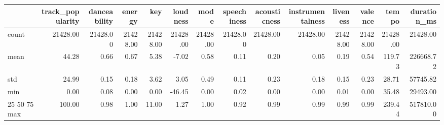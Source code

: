 \begin{tabular}{lrrrrrrrrrrrrr}
\toprule
 & track_popularity & danceability & energy & key & loudness & mode & speechiness & acousticness & instrumentalness & liveness & valence & tempo & duration_ms \\
\midrule
count & 21428.00 & 21428.00 & 21428.00 & 21428.00 & 21428.00 & 21428.00 & 21428.00 & 21428.00 & 21428.00 & 21428.00 & 21428.00 & 21428.00 & 21428.00 \\
mean & 44.28 & 0.66 & 0.67 & 5.38 & -7.02 & 0.58 & 0.11 & 0.20 & 0.05 & 0.19 & 0.54 & 119.73 & 226668.72 \\
std & 24.99 & 0.15 & 0.18 & 3.62 & 3.05 & 0.49 & 0.11 & 0.23 & 0.18 & 0.15 & 0.23 & 28.71 & 57745.82 \\
min & 0.00 & 0.08 & 0.00 & 0.00 & -46.45 & 0.00 & 0.02 & 0.00 & 0.00 & 0.01 & 0.00 & 35.48 & 29493.00 \\
25%
50%
75%
max & 100.00 & 0.98 & 1.00 & 11.00 & 1.27 & 1.00 & 0.92 & 0.99 & 0.99 & 0.99 & 0.99 & 239.44 & 517810.00 \\
\bottomrule
\end{tabular}
